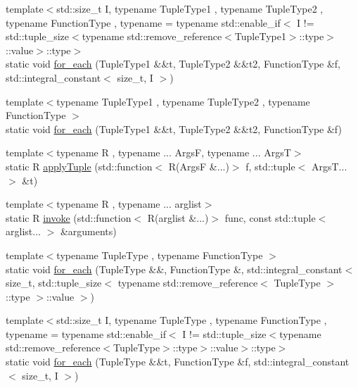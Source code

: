\begin{DoxyCompactItemize}
\item 
{\footnotesize template$<$std\+::size\+\_\+t I, typename Tuple\+Type1 , typename Tuple\+Type2 , typename Function\+Type , typename  = typename std\+::enable\+\_\+if$<$            I != std\+::tuple\+\_\+size$<$typename std\+::remove\+\_\+reference$<$\+Tuple\+Type1$>$\+::type$>$\+::value$>$\+::type$>$ }\\static void \mbox{\hyperlink{structfakeit_1_1TupleDispatcher_a42566b7faaac776dc99492e7c0b973b3}{for\+\_\+each}} (Tuple\+Type1 \&\&t, Tuple\+Type2 \&\&t2, Function\+Type \&f, std\+::integral\+\_\+constant$<$ size\+\_\+t, I $>$)
\item 
{\footnotesize template$<$typename Tuple\+Type1 , typename Tuple\+Type2 , typename Function\+Type $>$ }\\static void \mbox{\hyperlink{structfakeit_1_1TupleDispatcher_a1ddb90f24aa73dd61bf2b95c5f176cd5}{for\+\_\+each}} (Tuple\+Type1 \&\&t, Tuple\+Type2 \&\&t2, Function\+Type \&f)
\item 
{\footnotesize template$<$typename R , typename ... ArgsF, typename ... ArgsT$>$ }\\static R \mbox{\hyperlink{structfakeit_1_1TupleDispatcher_ac57ede994f304c03e3982e6fa4d1ca41}{apply\+Tuple}} (std\+::function$<$ R(ArgsF \&...)$>$ f, std\+::tuple$<$ Args\+T... $>$ \&t)
\item 
{\footnotesize template$<$typename R , typename ... arglist$>$ }\\static R \mbox{\hyperlink{structfakeit_1_1TupleDispatcher_a279619fd6d6649c4d99c459a3286469a}{invoke}} (std\+::function$<$ R(arglist \&...)$>$ func, const std\+::tuple$<$ arglist... $>$ \&arguments)
\item 
{\footnotesize template$<$typename Tuple\+Type , typename Function\+Type $>$ }\\static void \mbox{\hyperlink{structfakeit_1_1TupleDispatcher_af22c1fae8c695f722da986df9af411ca}{for\+\_\+each}} (Tuple\+Type \&\&, Function\+Type \&, std\+::integral\+\_\+constant$<$ size\+\_\+t, std\+::tuple\+\_\+size$<$ typename std\+::remove\+\_\+reference$<$ Tuple\+Type $>$\+::type $>$\+::value $>$)
\item 
{\footnotesize template$<$std\+::size\+\_\+t I, typename Tuple\+Type , typename Function\+Type , typename  = typename std\+::enable\+\_\+if$<$            I != std\+::tuple\+\_\+size$<$typename std\+::remove\+\_\+reference$<$\+Tuple\+Type$>$\+::type$>$\+::value$>$\+::type$>$ }\\static void \mbox{\hyperlink{structfakeit_1_1TupleDispatcher_afd32e025fbf695e16bb4b4ac1642c491}{for\+\_\+each}} (Tuple\+Type \&\&t, Function\+Type \&f, std\+::integral\+\_\+constant$<$ size\+\_\+t, I $>$)

\end{DoxyCompactItemize}
